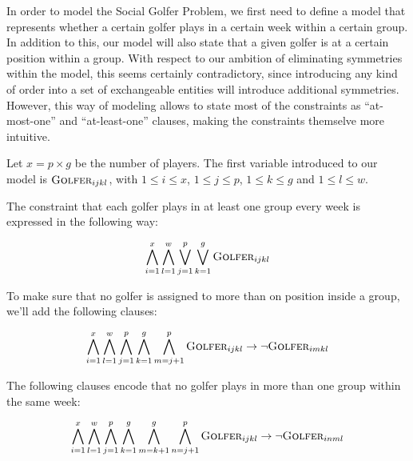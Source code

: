 \documentclass[a4paper]{scrartcl}
\begin{document}
In order to model the Social Golfer Problem, we first need to define a model that represents whether a certain golfer plays in a certain week within a certain group. In addition to this, our model will also state that a given golfer is at a certain position within a group. With respect to our ambition of eliminating symmetries within the model, this seems certainly contradictory, since introducing any kind of order into a set of exchangeable entities will introduce additional symmetries. However, this way of modeling allows to state most of the constraints as ``at-most-one'' and ``at-least-one'' clauses, making the constraints themselve more intuitive.

Let $x = p \times g$ be the number of players. The first variable introduced to our model is $\textsc{Golfer}_{ijkl}$, with $1 \leq i \leq x$, $1 \leq j \leq p$, $1 \leq k \leq g$ and $1 \leq l \leq w$.

The constraint that each golfer plays in at least one group every week is expressed in the following way:

\begin{equation}
\label{form:everyone_plays}
\centering
    \bigwedge \limits_{i=1}^x 
    \bigwedge \limits_{l=1}^w 
    \bigvee \limits_{j=1}^p
    \bigvee \limits_{k=1}^g 
    \textsc{Golfer}_{ijkl}
\end{equation}

To make sure that no golfer is assigned to more than on position inside a group, we'll add the following clauses:

\begin{equation}
\centering
    \bigwedge \limits_{i=1}^x 
    \bigwedge \limits_{l=1}^w 
    \bigwedge \limits_{j=1}^p
    \bigwedge \limits_{k=1}^g 
    \bigwedge \limits_{m=j+1}^p 
    \textsc{Golfer}_{ijkl} 
    \to
    \neg \textsc{Golfer}_{imkl}
\end{equation}

The following clauses encode that no golfer plays in more than one group within the same week:

\begin{equation}
\centering
    \bigwedge \limits_{i=1}^x 
    \bigwedge \limits_{l=1}^w 
    \bigwedge \limits_{j=1}^p
    \bigwedge \limits_{k=1}^g 
    \bigwedge \limits_{m=k+1}^g 
    \bigwedge \limits_{n=j+1}^p 
    \textsc{Golfer}_{ijkl} 
    \to
    \neg \textsc{Golfer}_{inml}
\end{equation}
\end{document}
